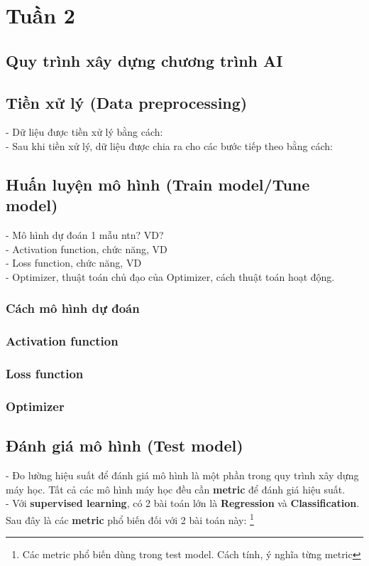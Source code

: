 \newpage
\section{Tuần 2}
\subsection{Quy trình xây dựng chương trình AI}

\subsection{Tiền xử lý (Data preprocessing)}
- Dữ liệu được tiền xử lý bằng cách:
\\- Sau khi tiền xử lý, dữ liệu được chia ra cho các bước tiếp theo bằng cách:
\subsection{Huấn luyện mô hình (Train model/Tune model)}
- Mô hình dự đoán 1 mẫu ntn? VD?
\\- Activation function, chức năng, VD
\\- Loss function, chức năng, VD
\\- Optimizer, thuật toán chủ đạo của Optimizer, cách thuật toán hoạt động.
\subsubsection{Cách mô hình dự đoán}
\subsubsection{Activation function}
\subsubsection{Loss function}
\subsubsection{Optimizer}
\subsection{Đánh giá mô hình (Test model)}
- Đo lường hiệu suất để đánh giá mô hình là một phần trong quy trình xây dựng máy học. Tất cả các mô hình máy học đều cần \textbf{metric} để đánh giá hiệu suất.
\\- Với \textbf{supervised learning}, có 2 bài toán lớn là \textbf{Regression} và \textbf{Classification}. Sau đây là các \textbf{metric} phổ biến đối với 2 bài toán này: \footnote{Các metric phổ biến dùng trong test model. Cách tính, ý nghĩa từng metric}
